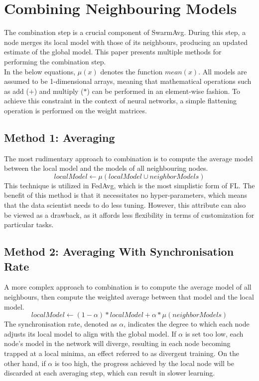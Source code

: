 \section{Combining Neighbouring Models} \label{mcm}
The combination step is a crucial component of SwarmAvg. During this step, a node merges its local model with those of its neighbours, producing an updated estimate of the global model. This paper presents multiple methods for performing the combination step. \\

In the below equations, $\mu(x)$ denotes the function $mean(x)$. All models are assumed to be 1-dimensional arrays, meaning that mathematical operations such as add ($+$) and multiply ($*$) can be performed in an element-wise fashion. To achieve this constraint in the context of neural networks, a simple flattening operation is performed on the weight matrices.

\subsection{Method 1: Averaging} \label{mcm:avg}
The most rudimentary approach to combination is to compute the average model between the local model and the models of all neighbouring nodes.
\[ localModel \gets \mu(localModel \cup neighborModels) \]
This technique is utilized in FedAvg, which is the most simplistic form of FL. The benefit of this method is that it necessitates no hyper-parameters, which means that the data scientist needs to do less tuning. However, this attribute can also be viewed as a drawback, as it affords less flexibility in terms of customization for particular tasks.

\subsection{Method 2: Averaging With Synchronisation Rate}
A more complex approach to combination is to compute the average model of all neighbours, then compute the weighted average between that model and the local model.
\[ localModel \gets (1 - \alpha) * localModel + \alpha * \mu(neighborModels) \]
The synchronisation rate, denoted as $\alpha$, indicates the degree to which each node adjusts its local model to align with the global model. If $\alpha$ is set too low, each node's model in the network will diverge, resulting in each node becoming trapped at a local minima, an effect referred to as divergent training. On the other hand, if $\alpha$ is too high, the progress achieved by the local node will be discarded at each averaging step, which can result in slower learning. \\

